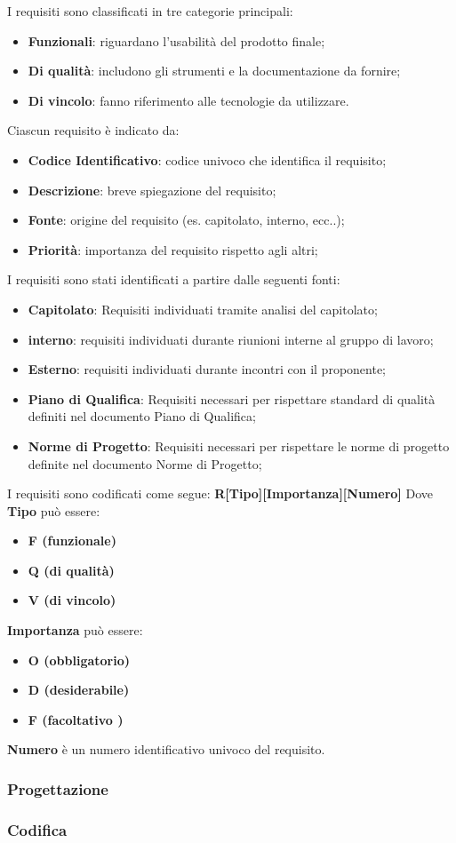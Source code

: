 
I requisiti sono classificati in tre categorie principali:  
\begin{itemize}
    \item \textbf{Funzionali}: riguardano l'usabilità del prodotto finale;  
    \item \textbf{Di qualità}: includono gli strumenti e la documentazione da fornire;  
    \item \textbf{Di vincolo}: fanno riferimento alle tecnologie da utilizzare.
\end{itemize}
Ciascun requisito è indicato da:
\begin{itemize}
    \item \textbf{Codice Identificativo}: codice univoco che identifica il requisito;
    \item \textbf{Descrizione}: breve spiegazione del requisito;
    \item \textbf{Fonte}: origine del requisito (es. capitolato, interno, ecc..);
    \item \textbf{Priorità}: importanza del requisito rispetto agli altri;
\end{itemize} 

I requisiti sono stati identificati a partire dalle seguenti fonti:
\begin{itemize}
    \item \textbf{Capitolato}: Requisiti individuati tramite analisi del capitolato;
    \item \textbf{interno}: requisiti individuati durante riunioni interne al gruppo di lavoro;
    \item \textbf{Esterno}: requisiti individuati durante incontri con il proponente;
    \item \textbf{Piano di Qualifica}: Requisiti necessari per rispettare standard di qualità definiti nel documento Piano di Qualifica;
    \item \textbf{Norme di Progetto}: Requisiti necessari per rispettare le norme di progetto definite nel documento Norme di Progetto;
\end{itemize}

I requisiti sono codificati come segue: \textbf{R[Tipo][Importanza][Numero]}
\newline
Dove \textbf{Tipo} può essere:
\begin{itemize}
    \item \textbf{F (funzionale)}
    \item \textbf{Q (di qualità)}
    \item \textbf{V (di vincolo)}
\end{itemize}
\textbf{Importanza} può essere:
\begin{itemize}
    \item \textbf{O (obbligatorio)}
    \item \textbf{D (desiderabile)}
    \item \textbf{F (facoltativo )}
\end{itemize}
\textbf{Numero} è un numero identificativo univoco del requisito.


\subsubsection{Progettazione}
\subsubsection{Codifica}